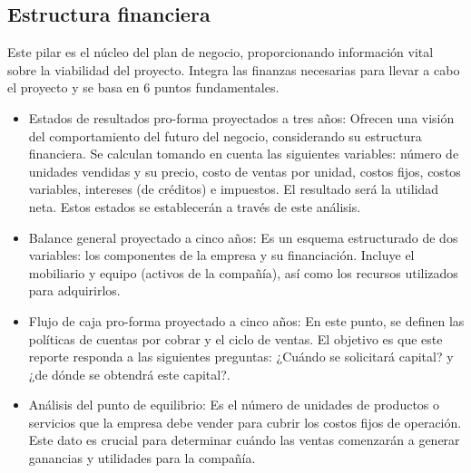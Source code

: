 {\color{red}
\subsection{Estructura financiera}

Este pilar es el núcleo del plan de negocio, proporcionando información vital sobre la
viabilidad del proyecto. Integra las finanzas necesarias para llevar a cabo el proyecto y se basa en 6 puntos fundamentales.

\begin{itemize}
    \item Estados de resultados pro-forma proyectados a tres años: Ofrecen una visión del comportamiento del futuro del negocio, considerando su estructura financiera. Se calculan tomando en cuenta las  siguientes variables: número de unidades vendidas y su precio, costo de ventas por unidad, costos fijos, costos variables, intereses (de créditos) e impuestos. El resultado será la utilidad neta. Estos estados se establecerán a través de este análisis.

    \item Balance general proyectado a cinco años: Es un esquema estructurado de dos variables: los componentes de la empresa y su financiación. Incluye el mobiliario y equipo (activos de la compañía), así como los recursos utilizados para adquirirlos. 

    \item Flujo de caja pro-forma proyectado a cinco años: En este punto, se definen las políticas de cuentas por cobrar y el ciclo de ventas. El objetivo es que este reporte responda a las siguientes preguntas: ¿Cuándo se solicitará capital? y ¿de dónde se obtendrá este capital?.

    \item Análisis del punto de equilibrio: Es el número de unidades de productos o servicios que la empresa debe vender para cubrir los costos fijos de operación. Este dato es crucial para determinar cuándo las ventas comenzarán a generar ganancias y utilidades para la   compañía.
\end{itemize}
}